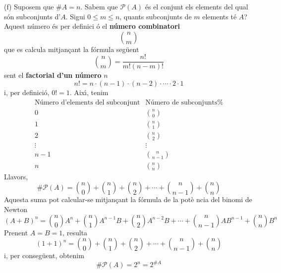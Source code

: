 \begin{solucio}
(f) Suposem que $\#A=n$. Sabem que $\mathcal{P}(A)$ \'{e}s el conjunt els
elements del qual s\'{o}n subconjunts d'$A$. Sigui $0\leq m\leq n$, quants
subconjunts de $m$ elements t\'{e} $A$? Aquest n\'{u}mero \'{e}s per definici%
\'{o} el \textbf{n\'{u}mero combinatori}
\begin{equation*}
\binom{n}{m}
\end{equation*}%
que es calcula mitjan\c{c}ant la f\'{o}rmula seg\"{u}ent%
\begin{equation*}
\binom{n}{m}=\frac{n!}{m!\left( n-m\right) !}
\end{equation*}%
sent el \textbf{factorial d'un n\'{u}mero} $n$%
\begin{equation*}
n!=n\cdot (n-1)\cdot (n-2)\cdot \cdots \cdot 2\cdot 1
\end{equation*}%
i, per definici\'{o}, $0!=1$. Aix\'{\i}, tenim%
\begin{equation*}
\begin{array}{cc}
\text{N\'{u}mero d'elements del subconjunt} & \text{N\'{u}mero de subconjunts%
} \\
0 & \binom{n}{0} \\
1 & \binom{n}{1} \\
2 & \binom{n}{2} \\
\vdots & \vdots \\
n-1 & \binom{n}{n-1} \\
n & \binom{n}{n}%
\end{array}%
\end{equation*}%
Llavors,%
\begin{equation*}
\#\mathcal{P}(A)=\binom{n}{0}+\binom{n}{1}+\binom{n}{2}+\cdots +\binom{n}{n-1%
}+\binom{n}{n}
\end{equation*}%
Aquesta suma pot calcular-se mitjan\c{c}ant la f\'{o}rmula de la pot\`{e}%
ncia del binomi de Newton
\begin{equation*}
(A+B)^{n}=\binom{n}{0}A^{n}+\binom{n}{1}A^{n-1}B+\binom{n}{2}A^{n-2}B+\cdots
+\binom{n}{n-1}AB^{n-1}+\binom{n}{n}B^{n}
\end{equation*}%
Prenent $A=B=1$, resulta%
\begin{equation*}
(1+1)^{n}=\binom{n}{0}+\binom{n}{1}+\binom{n}{2}+\cdots +\binom{n}{n-1}+%
\binom{n}{n}
\end{equation*}%
i, per conseg\"{u}ent, obtenim%
\begin{equation*}
\#\mathcal{P}(A)=2^{n}=2^{\#A}
\end{equation*}
\end{solucio}

